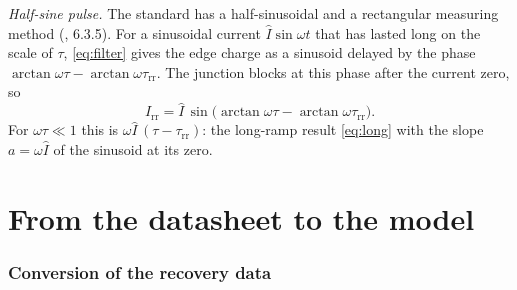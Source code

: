 \documentclass[10pt,a4paper]{scrartcl}
\newcommand{\Irr}{I_\mathrm{rr}}
\newcommand{\taurr}{\tau_\mathrm{rr}}
\begin{document}
\emph{Half-sine pulse.} The standard has a half-sinusoidal and a rectangular measuring method (\cite{iec60747}, 6.3.5). For a sinusoidal current $\hat I\sin\omega t$ that has lasted long on the scale of $\tau$, \eqref{eq:filter} gives the edge charge as a sinusoid delayed by the phase $\arctan\omega\tau - \arctan\omega\taurr$. The junction blocks at this phase after the current zero, so
\begin{equation}
\Irr = \hat I\,\sin\bigl(\arctan\omega\tau - \arctan\omega\taurr\bigr) .
\label{eq:sine}
\end{equation}
For $\omega\tau \ll 1$ this is $\omega\hat I\,(\tau-\taurr)$: the long-ramp result \eqref{eq:long} with the slope $a = \omega\hat I$ of the sinusoid at its zero.

\part{From the datasheet to the model}

\section{Conversion of the recovery data}
\label{sec:inverse}
\end{document}
